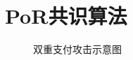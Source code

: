 \section{PoR共识算法}


\begin{figure}
\centering

\caption{双重支付攻击示意图}
\label{fig:por:overlap}
\end{figure}
